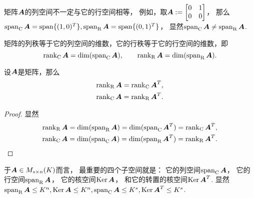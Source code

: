 矩阵\(\vb{A}\)的列空间不一定与它的行空间相等，
例如，取\(
	\vb{A}
	\defeq
	\begin{bmatrix}
		0 & 1 \\
		0 & 0
	\end{bmatrix}
\)，
那么\(
	\SpanC\vb{A}
	= \Span\{(1,0)^T\},
	\SpanR\vb{A}
	= \Span\{(0,1)^T\}
\)，
显然\(\SpanC\vb{A} \neq \SpanR\vb{A}\).

矩阵的列秩等于它的列空间的维数，它的行秩等于它的行空间的维数，即\begin{equation*}
	\RankC\vb{A} = \dim(\SpanC\vb{A}),
	\qquad
	\RankR\vb{A} = \dim(\SpanR\vb{A}).
\end{equation*}

\begin{proposition}\label{theorem:向量空间.矩阵的行秩与列秩分别等于它的转置矩阵的列秩与行秩}
设\(\vb{A}\)是矩阵，那么\begin{gather}
	\RankR\vb{A} = \RankC\vb{A}^T, \\
	\RankC\vb{A} = \RankR\vb{A}^T.
\end{gather}
\begin{proof}
显然\begin{gather*}
	\RankR\vb{A}
	= \dim(\SpanR\vb{A})
	= \dim(\SpanC\vb{A}^T)
	= \RankC\vb{A}^T, \\
	\RankC\vb{A}
	= \dim(\SpanC\vb{A})
	= \dim(\SpanR\vb{A}^T)
	= \RankR\vb{A}^T.
	\qedhere
\end{gather*}
\end{proof}
\end{proposition}

于\(\vb{A} \in M_{s \times n}(K)\)而言，
最重要的四个子空间就是：
它的列空间\(\SpanC\vb{A}\)，
它的行空间\(\SpanR\vb{A}\)，
它的核空间\(\Ker\vb{A}\)，
和它的转置的核空间\(\Ker\vb{A}^T\).
显然\(
	\SpanR\vb{A} \leq K^n,
	\Ker\vb{A} \leq K^n,
	\SpanC\vb{A} \leq K^s,
	\Ker\vb{A}^T \leq K^s
\).

